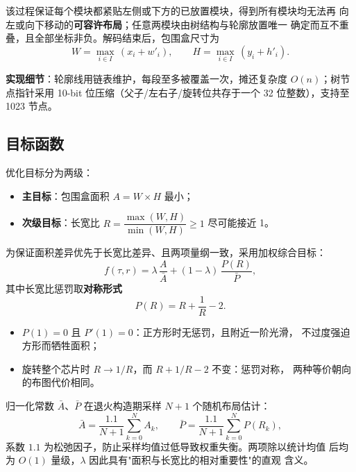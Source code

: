 \documentclass[12pt,a4paper]{article}
\begin{document}
该过程保证每个模块都紧贴左侧或下方的已放置模块，得到所有模块均无法再
向左或向下移动的\textbf{可容许布局}；任意两模块由树结构与轮廓放置唯一
确定而互不重叠，且全部坐标非负。解码结束后，包围盒尺寸为
\begin{equation}
W = \max_{i \in I}\, (x_i + w'_i), \qquad
H = \max_{i \in I}\, (y_i + h'_i).
\end{equation}

\textbf{实现细节}：轮廓线用链表维护，每段至多被覆盖一次，摊还复杂度
$O(n)$；树节点指针采用 10-bit 位压缩（父子/左右子/旋转位共存于一个
32 位整数），支持至 1023 节点。

\subsection{目标函数}

优化目标分为两级：
\begin{itemize}
    \item \textbf{主目标}：包围盒面积 $A = W \times H$ 最小；
    \item \textbf{次级目标}：长宽比 $R = \dfrac{\max(W,H)}{\min(W,H)} \ge 1$
    尽可能接近 1。
\end{itemize}

为保证面积差异优先于长宽比差异、且两项量纲一致，采用加权综合目标：
\begin{equation}
\label{eq:cost}
f(\tau, r) = \lambda\, \frac{A}{\bar A}
           + (1 - \lambda)\, \frac{P(R)}{\bar P},
\end{equation}
其中长宽比惩罚取\textbf{对称形式}
\begin{equation}
P(R) = R + \frac{1}{R} - 2.
\end{equation}

\begin{itemize}
    \item $P(1) = 0$ 且 $P'(1) = 0$：正方形时无惩罚，且附近一阶光滑，
    不过度强迫方形而牺牲面积；
    \item 旋转整个芯片时 $R \to 1/R$，而 $R + 1/R - 2$ 不变：惩罚对称，
    两种等价朝向的布图代价相同。
\end{itemize}

归一化常数 $\bar A$、$\bar P$ 在退火构造期采样 $N+1$ 个随机布局估计：
\begin{equation}
\bar A = \frac{1.1}{N+1} \sum_{k=0}^{N} A_k, \qquad
\bar P = \frac{1.1}{N+1} \sum_{k=0}^{N} P(R_k),
\end{equation}
系数 $1.1$ 为松弛因子，防止采样均值过低导致权重失衡。两项除以统计均值
后均为 $O(1)$ 量级，$\lambda$ 因此具有"面积与长宽比的相对重要性"的直观
含义。
\end{document}
